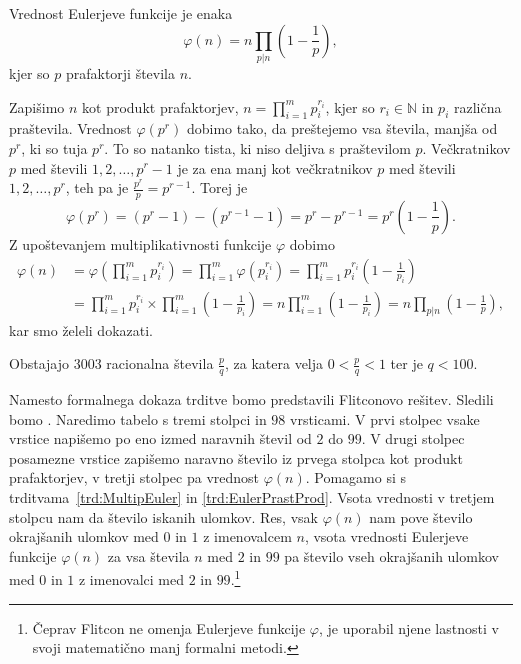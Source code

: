 \documentclass[mat1]{fmfdelo}
\begin{document}
\begin{trditev}
\label{trd:EulerPrastProd}
Vrednost Eulerjeve funkcije je enaka
\begin{equation}
\varphi(n) = n \prod_{p|n} \left (1 - \frac{1}{p} \right ),
\end{equation}
kjer so $p$ prafaktorji števila $n$.
\end{trditev}

\begin{dokaz}
Zapišimo $n$ kot produkt prafaktorjev, \(n=\prod_{i=1}^m p_i^{r_i}\), kjer so $r_i \in \mathbb{N}$ in $p_i$ različna praštevila.
Vrednost $\varphi(p^{r})$ dobimo tako, da preštejemo vsa števila, manjša od $p^r$, ki so tuja $p^r$. To so natanko tista, ki niso deljiva s praštevilom $p$. Večkratnikov $p$ med števili $1, 2, \ldots, p^r-1$ je za ena manj kot večkratnikov $p$ med števili $1, 2, \ldots, p^r$, teh pa je \( \frac{p^r}{p} = p^{r-1}. \)
Torej je 
\[ \varphi(p^r) = (p^r - 1) - (p^{r-1} - 1) = p^r - p^{r-1} = p^r \left (1 - \frac{1}{p} \right). \] 
Z upoštevanjem multiplikativnosti funkcije $\varphi$ dobimo
%
\begin{align*}
 \varphi(n) 
 &= \varphi \left (\prod_{i=1}^m p_i^{r_i} \right ) = \prod_{i=1}^m \varphi (p_i^{r_i} ) = 
 \prod_{i=1}^m p_i^{r_i} \left (1 - \frac{1}{p_i} \right ) \\
 &= \prod_{i=1}^m p_i^{r_i} \times \prod_{i=1}^m \left (1 - \frac{1}{p_i} \right ) = 
 n \prod_{i=1}^m \left (1 - \frac{1}{p_i} \right ) = n \prod_{p|n} \left (1 - \frac{1}{p} \right ),
\end{align*}
kar smo želeli dokazati.
\end{dokaz}
%

\begin{trditev}
Obstajajo $3003$ racionalna števila $\frac{p}{q}$, za katera velja $0<\frac{p}{q}<1$ ter je $q < 100$.
\end{trditev}

Namesto formalnega dokaza trditve bomo predstavili Flitconovo rešitev. Sledili bomo \cite[poglavje 1.2]{fareyproject}. Naredimo tabelo s tremi stolpci in $98$ vrsticami. V prvi stolpec vsake vrstice napišemo po eno izmed naravnih števil od $2$ do $99$. V drugi stolpec posamezne vrstice zapišemo naravno število iz prvega stolpca kot produkt prafaktorjev, v tretji stolpec pa vrednost $\varphi(n)$. Pomagamo si s trditvama~\ref{trd:MultipEuler} in \ref{trd:EulerPrastProd}. Vsota vrednosti v tretjem stolpcu nam da število iskanih ulomkov. Res, vsak $\varphi(n)$ nam pove število okrajšanih ulomkov med $0$ in $1$ z imenovalcem $n$, vsota vrednosti Eulerjeve funkcije $\varphi(n)$ za vsa števila $n$ med $2$ in $99$ pa število vseh okrajšanih ulomkov med $0$ in $1$ z imenovalci med $2$ in $99$.\footnote{Čeprav Flitcon ne omenja Eulerjeve funkcije $\varphi$, je uporabil njene lastnosti v svoji matematično manj formalni metodi.}
\end{document}
